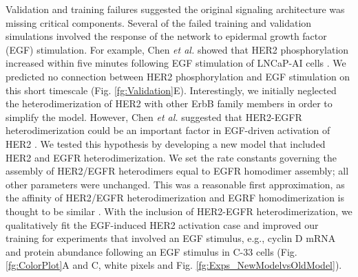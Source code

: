 \documentclass[12pt]{article}
\begin{document}
Validation and training failures suggested the original signaling architecture was missing critical components. 
Several of the failed training and validation simulations involved the response of the network to epidermal growth factor (EGF) stimulation. 
For example, Chen \textit{et al.} showed that HER2 phosphorylation increased within five minutes following EGF stimulation of LNCaP-AI cells \citep{Chen2011}. 
We predicted no connection between HER2 phosphorylation and EGF stimulation on this short timescale (Fig. \ref{fg:Validation}E). 
Interestingly, we initially neglected the heterodimerization of HER2 with other ErbB family members in order to simplify the model.
However, Chen \textit{et al.} suggested that HER2-EGFR heterodimerization could be an important factor in EGF-driven activation of HER2 \cite{Chen2011}. 
We tested this hypothesis by developing a new model that included HER2 and EGFR heterodimerization. 
We set the rate constants governing the assembly of HER2/EGFR heterodimers equal to EGFR homodimer assembly; all other parameters were unchanged.
This was a reasonable first approximation, as the affinity of HER2/EGFR heterodimerization and EGRF homodimerization is thought to be similar \cite{Hendriks2003}. 
With the inclusion of HER2-EGFR heterodimerization, we qualitatively fit the EGF-induced HER2 activation case and improved our training for experiments that involved an EGF stimulus, e.g., cyclin D mRNA and protein abundance following an EGF stimulus in C-33 cells (Fig. \ref{fg:ColorPlot}A and C, white pixels and Fig. \ref{fg:Exps_NewModelvsOldModel}).   

\end{document}
